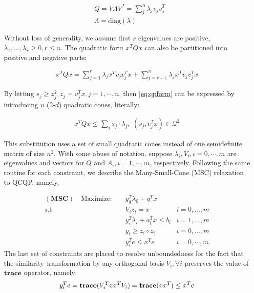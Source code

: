 \documentclass[../main]{subfiles}
\begin{document}
\begin{equation}
  \begin{aligned}
     & Q = V\Lambda V ^T =\sum_j^n \lambda_j v_j  v_j^T \\
     & \Lambda = \mathrm{diag}(\lambda)
  \end{aligned}
\end{equation}

Without loss of generality, we assume first \(r\) eigenvalues are positive, \(\lambda_1, ..., \lambda_r \ge 0, r\le n \). The quadratic form \(x^TQx\) can also be partitioned into positive and negative parts:

\begin{equation}\label{eq:qpform}
  \begin{aligned}
    x^TQx = \sum_{j=1}^r \lambda_j x^T v_j v_j^T x + \sum_{j=r+1}^n \lambda_j x^T v_j v_j^T x
  \end{aligned}
\end{equation}

By letting \(s_j \ge z_j^2, z_j = v_j^T x, j = 1, \cdots, n\), then \eqref{eq:qpform} can be expressed by introducing \(n\) (2-\(d\)) quadratic cones, literally:

\begin{equation}
  \begin{aligned}
    x^TQx \le \sum_j s_j \cdot \lambda_j,\; (s_j, v^T_j x) \in \mathcal{Q}^2
  \end{aligned}
\end{equation}

This substitution uses a set of small quadratic cones instead of one semidefinite matrix of size \(n^2\). With some abuse of notation, suppose \(\lambda_i, V_i, i = 0, \cdots, m\) are eigenvalues and vectors for \(Q\) and \(A_i, i = 1,
\cdots, m\), respectively. Following the same routine for each constraint, we describe the Many-Small-Cone (MSC) relaxation to QCQP, namely,

\begin{equation}
  \begin{aligned}
    (\mathbf{MSC}) \quad \mathrm{Maximize: }\quad & y_0 ^T\lambda_0 + q^Tx                              \\
    \mathrm{s.t.} \quad                           & V_i z_i = x                        & i=0,...,m      \\
                                                  & y_i ^T\lambda_i  + a_i^Tx  \le b_i & i=1,...,m      \\
    \label{quad}                                  & y_i \ge z_i \circ z_i              & i=0,...,m      \\
                                                  & y_i^Te \le x^Te                    & i=0, \cdots, m
  \end{aligned}
\end{equation}
The last set of constraints are placed to resolve unboundedness for the fact that the similarity transformation by any orthogonal basis \(V_i, \forall i\) preserves the value of \(\mathbf{trace}\) operator, namely:
\begin{equation}
  y_i^Te = \mathbf{trace}( V_i^Txx^T V_i) = \mathbf{trace} (xx^T) \le x^Te
\end{equation}
\end{document}
